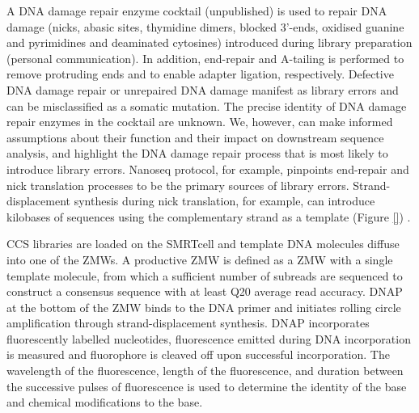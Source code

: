 A DNA damage repair enzyme cocktail (unpublished) is used to repair DNA damage (nicks, abasic sites, thymidine dimers, blocked 3’-ends, oxidised guanine and pyrimidines and deaminated cytosines) introduced during library preparation (personal communication). In addition, end-repair and A-tailing is performed to remove protruding ends and to enable adapter ligation, respectively. Defective DNA damage repair or unrepaired DNA damage manifest as library errors and can be misclassified as a somatic mutation. The precise identity of DNA damage repair enzymes in the cocktail are unknown. We, however, can make informed assumptions about their function and their impact on downstream sequence analysis, and highlight the DNA damage repair process that is most likely to introduce library errors. Nanoseq protocol, for example, pinpoints end-repair and nick translation processes to be the primary sources of library errors. Strand-displacement synthesis during nick translation, for example, can introduce kilobases of sequences using the complementary strand as a template (Figure \ref{}) \cite{}. 

CCS libraries are loaded on the SMRTcell and template DNA molecules diffuse into one of the ZMWs. A productive ZMW is defined as a ZMW with a single template molecule, from which a sufficient number of subreads are sequenced to construct a consensus sequence with at least Q20 average read accuracy. DNAP at the bottom of the ZMW binds to the DNA primer and initiates rolling circle amplification through strand-displacement synthesis. DNAP incorporates fluorescently labelled nucleotides, fluorescence emitted during DNA incorporation is measured and fluorophore is cleaved off upon successful incorporation. The wavelength of the fluorescence, length of the fluorescence, and duration between the successive pulses of fluorescence is used to determine the identity of the base and chemical modifications to the base. 

